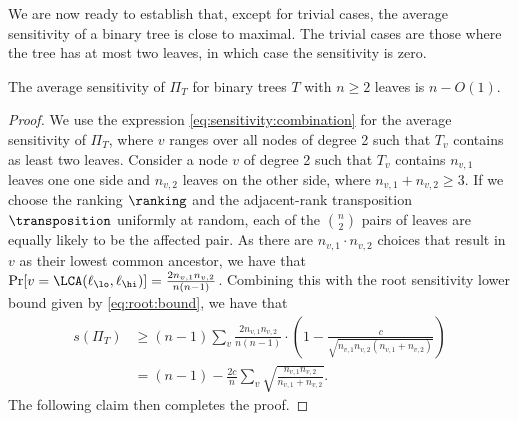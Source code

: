 \documentclass{toc}
\begin{document}
We are now ready to establish that, except for trivial cases, the average sensitivity of a binary tree is close to maximal. The trivial cases are those where the tree has at most two leaves, in which case the sensitivity is zero. 
\begin{lemma}
\label{lemma:sensitivity:binary}
The average sensitivity of $\Pi_T$ for binary trees $T$ with $n \ge 2$ leaves is $n-O(1)$.
\end{lemma}
\begin{proof}
We use the expression \eqref{eq:sensitivity:combination} for the average sensitivity of $\Pi_T$, where $v$ ranges over all nodes of degree 2 such that $T_v$ contains as least two leaves.
Consider a node $v$ of degree 2 such that $T_v$ contains $n_{v,1}$ leaves one one side and $n_{v,2}$ leaves on the other side, where $n_{v,1}+n_{v,2} \ge 3$. If we choose the ranking $\ranking$ and the adjacent-rank transposition $\transposition$ uniformly at random, each of the $\binom{n}{2}$ pairs of leaves are equally likely to be the affected pair. As there are $n_{v,1} \cdot n_{v,2}$ choices that result in $v$ as their lowest common ancestor, we have that
$\Pr[ v = \LCA(\ell_\lo,\ell_\hi) ] = \frac{2 n_{v,1} n_{v,2}}{n(n-1)}$. Combining this with the root sensitivity lower bound given by \eqref{eq:root:bound}, we have that
\begin{align*} 
s(\Pi_T) & \ge (n-1) \sum_v \frac{2 n_{v,1} n_{v,2}}{n(n-1)} \cdot \left( 1 - \frac{c}{\sqrt{n_{v,1} n_{v,2} (n_{v,1}+n_{v,2})}} \right)  \\
& = (n-1) - \frac{2c}{n} \sum_v \sqrt{\frac{n_{v,1} n_{v,2}}{n_{v,1}+n_{v,2}}}. 
\end{align*}
The following claim then completes the proof.
\end{proof}
\end{document}
